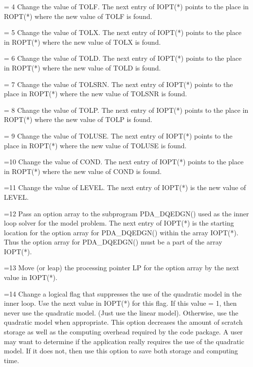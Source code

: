 \documentclass[11pt,twoside,nolof]{starlink}
\begin{document}
\begin{terminalv}
     = 4          Change the value of TOLF.  The next entry of
                  IOPT(*) points to the place in ROPT(*) where the
                  new value of TOLF is found.

     = 5          Change the value of TOLX.  The next entry of
                  IOPT(*) points to the place in ROPT(*) where the
                  new value of TOLX is found.

     = 6          Change the value of TOLD.  The next entry of
                  IOPT(*) points to the place in ROPT(*) where the
                  new value of TOLD is found.

     = 7          Change the value of TOLSRN.  The next entry of
                  IOPT(*) points to the place in ROPT(*) where the
                  new value of TOLSNR is found.

     = 8          Change the value of TOLP.  The next entry of
                  IOPT(*) points to the place in ROPT(*) where the
                  new value of TOLP is found.

     = 9          Change the value of TOLUSE.  The next entry of
                  IOPT(*) points to the place in ROPT(*) where the
                  new value of TOLUSE is found.

     =10          Change the value of COND.  The next entry of
                  IOPT(*) points to the place in ROPT(*) where the
                  new value of COND is found.

     =11          Change the value of LEVEL.  The next entry of
                  IOPT(*) is the new value of LEVEL.

     =12          Pass an option array to the subprogram PDA_DQEDGN()
                  used as the inner loop solver for the
                  model problem.  The next entry of IOPT(*) is the
                  starting location for the option array for
                  PDA_DQEDGN() within the array IOPT(*).  Thus the
                  option array for PDA_DQEDGN() must be a part of
                  the array IOPT(*).

     =13          Move (or leap) the processing pointer LP for the
                  option array by the next value in IOPT(*).

     =14          Change a logical flag that suppresses the
                  use of the quadratic model in the inner
                  loop.  Use the next value in IOPT(*) for
                  this flag.  If this value = 1, then never
                  use the quadratic model.  (Just use the
                  linear model).  Otherwise, use the quadratic
                  model when appropriate.  This option decreases
                  the amount of scratch storage as well as the
                  computing overhead required by the code package.
                  A user may want to determine if the application
                  really requires the use of the quadratic model.
                  If it does not, then use this option to save
                  both storage and computing time.


\end{terminalv}
\end{document}
